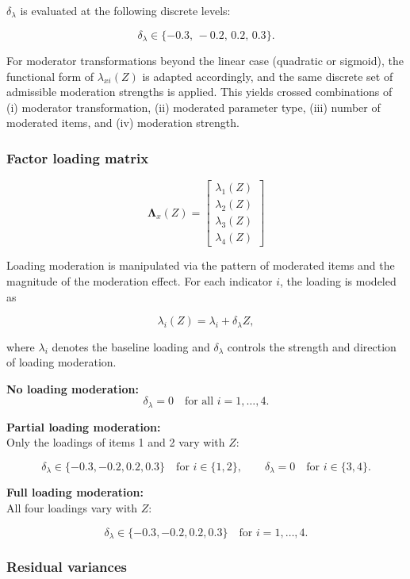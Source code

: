 \documentclass[
  man,
  floatsintext]{apa7}
\begin{document}
\(\delta_{\lambda}\) is evaluated at the following discrete levels:

\[
\delta_{\lambda} \in \{-0.3,\,-0.2,\,0.2,\,0.3\}.
\]

For moderator transformations beyond the linear case (quadratic or
sigmoid), the functional form of \(\lambda_{xi}(Z)\) is adapted
accordingly, and the same discrete set of admissible moderation
strengths is applied. This yields crossed combinations of (i) moderator
transformation, (ii) moderated parameter type, (iii) number of moderated
items, and (iv) moderation strength.

\subsubsection{Factor loading matrix}\label{factor-loading-matrix}

\[
\boldsymbol{\Lambda}_x(Z) =
\begin{bmatrix}
\lambda_1(Z) \\
\lambda_2(Z) \\
\lambda_3(Z)\\
\lambda_4(Z)
\end{bmatrix}
\]

Loading moderation is manipulated via the pattern of moderated items and
the magnitude of the moderation effect. For each indicator \(i\), the
loading is modeled as

\[
\lambda_i(Z) = \lambda_i + \delta_{\lambda} Z,
\]

where \(\lambda_i\) denotes the baseline loading and
\(\delta_{\lambda}\) controls the strength and direction of loading
moderation.

\textbf{No loading moderation:}\\
\[
\delta_{\lambda}=0 \quad \text{for all } i=1,\dots,4.
\]

\textbf{Partial loading moderation:}\\
Only the loadings of items 1 and 2 vary with \(Z\):

\[
\delta_{\lambda} \in \{-0.3,-0.2,0.2,0.3\}
\quad \text{for } i \in \{1,2\},
\qquad
\delta_{\lambda}=0
\quad \text{for } i \in \{3,4\}.
\]

\textbf{Full loading moderation:}\\
All four loadings vary with \(Z\):

\[
\delta_{\lambda} \in \{-0.3,-0.2,0.2,0.3\}
\quad \text{for } i=1,\dots,4.
\]

\subsubsection{Residual variances}\label{residual-variances}
\end{document}
